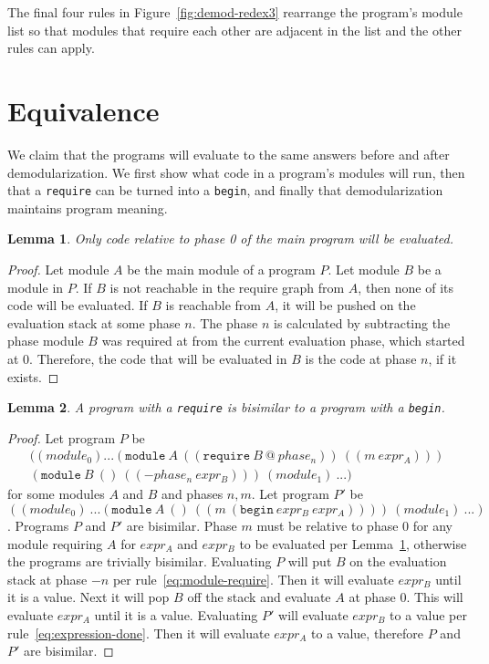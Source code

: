 The final four rules in Figure~\ref{fig:demod-redex3} rearrange the program's module list so that modules that require each other are adjacent in the list and the other rules can apply.

\section{Equivalence}
We claim that the programs will evaluate to the same answers before and after demodularization. 
We first show what code in a program's modules will run, then that a \texttt{require} can be turned into a \texttt{begin}, and finally that demodularization maintains program meaning.

\newtheorem{lemma}{Lemma}

\begin{lemma}
  \label{lem:phase0}
  Only code relative to phase 0 of the main program will be evaluated.
\end{lemma}
\begin{proof}
  Let module $A$ be the main module of a program $P$. 
  Let module $B$ be a module in $P$. 
  If $B$ is not reachable in the require graph from $A$, then none of its code will be evaluated.
  If $B$ is reachable from $A$, it will be pushed on the evaluation stack at some phase $n$. The phase $n$ is calculated by subtracting the phase module $B$ was required at from the current evaluation phase, which started at 0. 
  Therefore, the code that will be evaluated in $B$ is the code at phase $n$, if it exists.
\end{proof}

\begin{lemma}
  \label{lem:reqbegin}
  A program with a \texttt{require} is bisimilar to a program with a \texttt{begin}.
\end{lemma}
\begin{proof}
  Let program $P$ be
  \begin{equation*}
  \begin{split}
    ((module_0) ... (\texttt{module}\ A\ ((\texttt{require}\ B\ \texttt{@}\ phase_n))\ ((m\ expr_A))) \\
  (\texttt{module}\ B\ ()\ ((-phase_n\ expr_B)))\ (module_1)\ ...)
\end{split}
\end{equation*}
    for some modules $A$ and $B$ and phases $n, m$. Let program $P'$ be 
    \[((module_0)\ ... (\texttt{module}\ A\ ()\ ((m\ (\texttt{begin}\ expr_B\ expr_A))))\ (module_1)\ ...)\]. 
  Programs $P$ and $P'$ are bisimilar.
  Phase $m$ must be relative to phase 0 for any module requiring $A$ for $expr_A$ and $expr_B$ to be evaluated per Lemma~\ref{lem:phase0}, otherwise the programs are trivially bisimilar. 
  Evaluating $P$ will put $B$ on the evaluation stack at phase $-n$ per rule~\ref{eq:module-require}. 
  Then it will evaluate $expr_B$ until it is a value. 
  Next it will pop $B$ off the stack and evaluate $A$ at phase 0.
  This will evaluate $expr_A$ until it is a value.
  Evaluating $P'$ will evaluate $expr_B$ to a value per rule~\ref{eq:expression-done}.
  Then it will evaluate $expr_A$ to a value, therefore $P$ and $P'$ are bisimilar.
\end{proof}

